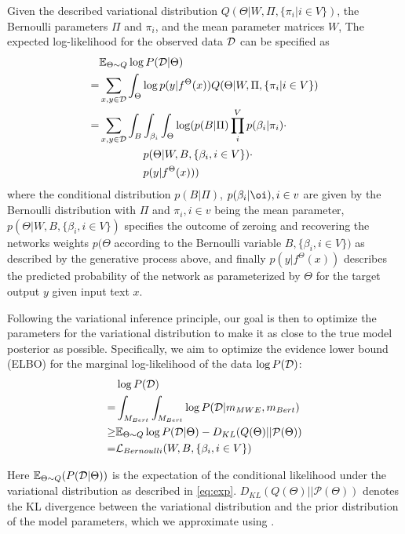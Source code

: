 Given the described variational distribution $Q(\Theta | W, \Pi, \{\pi_i | i \in V\})$,   
the Bernoulli parameters $\Pi$ and $\pi_i$, and the mean parameter matrices $W$,
The expected log-likelihood for the observed data $\mathcal{D}$  can be specified as 
\begin{align}
& \mathbb{E}_{\Theta \sim Q} \log P (\mathcalD | \Theta) \nonumber\\ 
= & \sum_{x, y \in \mathcalD} \int_{\Theta} \log p(y \vert f^{\Theta}(x)) Q(\Theta | W, \Pi, \{\pi_i | i \in V\}) \nonumber\\ 
= & \sum_{x, y \in \mathcalD} \int_B \int_{\beta_i}\int_{\Theta} \log ( p(B | \Pi) \prod_i^{V} p(\beta_i | \pi_i) \cdot \nonumber\\ 
& \quad \quad \quad \quad p(\Theta \vert W, B, \{\beta_i, i \in V\}) \cdot \nonumber\\ 
& \quad \quad \quad \quad p(y \vert f^{\Theta}(x)) )
\label{eq:exp}
\end{align}
where the conditional distribution 
$p(B | \Pi)$, $p(\beta_i | \oi), i\in v$ are given by the Bernoulli distribution with $\Pi$ and $\pi_i, i\in v$ being the mean parameter, 
$p(\Theta \vert W, B, \{\beta_i, i \in V\})$ specifies the outcome of zeroing and recovering the networks weights $p(\Theta$ according to the Bernoulli variable $B, \{\beta_i, i \in V\})$ as described by the generative process above,
and finally $p(y \vert f^{\Theta}(x))$ describes the predicted probability of the network as parameterized by $\Theta$ for the target output $y$ given input text $x$. 


Following the variational inference principle, our goal is then to optimize the parameters for the variational distribution to make it as close to the true model posterior as possible. Specifically, we aim to optimize the evidence lower bound (ELBO) for the marginal log-likelihood of the data $\log P( \mathcal{D} )$: 
\begin{align}
    &\log P( \mathcalD ) \nonumber\\
    = & \int_{M_{Bert}} \int_{M_{Bert}} \log P( \mathcalD | m_{MWE}, m_{Bert} ) \nonumber\\
    \geq& \mathbb{E}_{\Theta \sim Q} \log P (\mathcalD | \Theta) - D_{KL}(Q( \Theta) ||\mathcal{P}( \Theta)) \nonumber\\
    = & \mathcal{L}_{Bernoulli} (W, B, \{\beta_i, i \in V\}) \label{eq:elbo0}
\end{align}

Here $\mathbb{E}_{\Theta \sim Q} (P (\mathcal{D} | \Theta) )$ is the expectation of the conditional likelihood under the variational distribution as described in \autoref{eq:exp}. $D_{KL}(Q( \Theta) ||\mathcal{P}( \Theta))$ denotes the KL divergence between the variational distribution and the prior distribution of the model parameters, which we approximate using \cite{gal2016uncertainty}.
